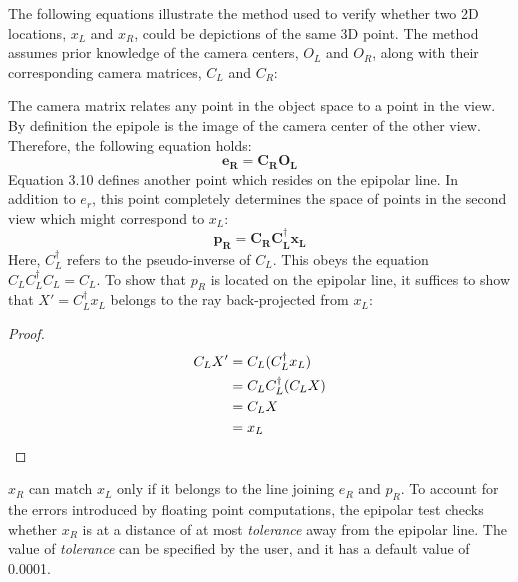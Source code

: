 \documentclass[12pt,a4paper,twoside,openright]{report}
\begin{document}
The following equations illustrate the method used to verify whether two 2D locations, $x_{L}$ and $x_{R}$, could be depictions of the same 3D point. The method assumes prior knowledge of the camera centers, $O_{L}$ and $O_{R}$, along with their corresponding camera matrices, $C_{L}$ and $C_{R}$:\\
\linebreak
\begin{adjustwidth}{0.7cm}{}
The camera matrix relates any point in the object space to a point in the view. By definition the epipole is the image of the camera center of the other view. Therefore, the following equation holds:
\begin{equation}
\mathbf{e_{R} = C_{R} O_{L}}
\end{equation}
\linebreak
Equation 3.10 defines another point which resides on the epipolar line. In addition to $e_{r}$, this point completely determines the space of points in the second view which might correspond to $x_{L}$:
\begin{equation}
\mathbf{p_{R} = C_{R} C_{L}^{\dagger} x_{L}}
\end{equation}
Here, $C_{L}^{\dagger}$ refers to the pseudo-inverse of $C_{L}$. This obeys the equation $C_{L} C_{L}^{\dagger} C_{L} = C_{L}$. 
\linebreak
To show that $p_{R}$ is located on the epipolar line, it suffices to show that $X' = C_{L}^{\dagger} x_{L}$ belongs to the ray back-projected from $x_{L}$:\\

\begin{proof} 
\begin{align}
C_{L}X' &= C_{L} (C_{L}^{\dagger} x_{L})\\
		&= C_{L} C_{L}^{\dagger} (C_{L} X)\\ 
		&= C_{L} X\\
		&= x_{L} \qedhere
 \end{align}
\end{proof}


$x_{R}$ can match $x_{L}$ only if it belongs to the line joining $e_{R}$ and $p_{R}$. To account for the errors introduced by floating point computations, the epipolar test checks whether $x_{R}$ is at a distance of at most \emph{tolerance} away from the epipolar line. The value of \emph{tolerance} can be specified by the user, and it has a default value of 0.0001.   
\end{adjustwidth}
\end{document}
